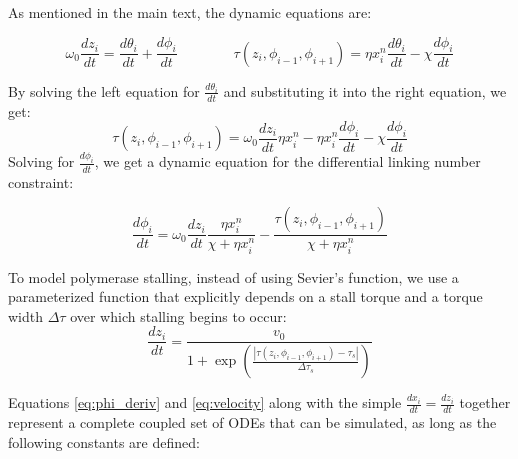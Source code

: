 \documentclass[11pt]{article}
\begin{document}
As mentioned in the main text, the dynamic equations are:

\begin{equation}
    \omega_0 \frac{d z_i}{dt} = \frac{d \theta_i}{dt} + \frac{d \phi_i}{dt} \qquad \qquad \tau(z_i, \phi_{i-1}, \phi_{i+1}) = \eta x_i^n \frac{d\theta_i}{dt} - \chi \frac{d\phi_i}{dt}
\end{equation}

By solving the left equation for \(\frac{d \theta_i}{dt}\) and substituting it into the right equation, we get:
\[\tau(z_i, \phi_{i-1}, \phi_{i+1}) = \omega_0 \frac{dz_i}{dt} \eta x_i^n - \eta x_i^n \frac{d\phi_i}{dt} - \chi \frac{d\phi_i}{dt}\]
Solving for \(\frac{d\phi_i}{dt}\), we get a dynamic equation for the differential linking number constraint:

\begin{equation}
    \frac{d\phi_i}{dt} = \omega_0 \frac{dz_i}{dt} \frac{\eta x_i^n}{\chi + \eta x_i^n} - \frac{\tau(z_i, \phi_{i-1}, \phi_{i+1})}{\chi + \eta x_i^n}
\end{equation} \label{eq:phi_deriv}

To model polymerase stalling, instead of using Sevier's function, we use a parameterized function that explicitly depends on a stall torque and a torque width \(\Delta \tau\) over which stalling begins to occur:
\begin{equation}
    \frac{dz_i}{dt} = \frac{v_0}{1 + \exp\left(\frac{|\tau(z_i, \phi_{i-1}, \phi_{i+1}) - \tau_s|}{\Delta \tau_s}\right)}
\end{equation} \label{eq:velocity}

Equations \ref{eq:phi_deriv} and \ref{eq:velocity} along with the simple \(\frac{dx_i}{dt} = \frac{dz_i}{dt}\) together represent a complete coupled set of ODEs that can be simulated, as long as the following constants are defined:
\end{document}
